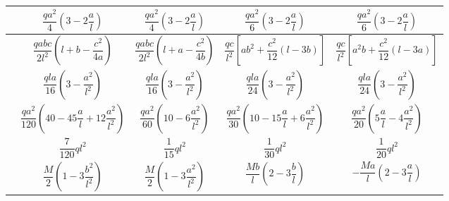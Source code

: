 \begin{table}[H]
{\begin{tabular}{m{4cm}cccc}
			 & \large{$\dfrac{qa^2}{4}\left(3-2\dfrac{a}{l}\right)$} & \large{$\dfrac{qa^2}{4}\left(3-2\dfrac{a}{l}\right)$} & \large{$\dfrac{qa^2}{6}\left(3-2\dfrac{a}{l}\right)$} & \large{$\dfrac{qa^2}{6}\left(3-2\dfrac{a}{l}\right)$} \\ \midrule
			 & \large{$\dfrac{qabc}{2l^2}\left(l+b-\dfrac{c^2}{4a}\right)$} & \large{$\dfrac{qabc}{2l^2}\left(l+a-\dfrac{c^2}{4b}\right)$} & \large{$\dfrac{qc}{l^2}\left[ab^2+\dfrac{c^2}{12}\left(l-3b\right)\right]$} & \large{$\dfrac{qc}{l^2}\left[a^2b+\dfrac{c^2}{12}\left(l-3a\right)\right]$} \\ \midrule
			 & \large{$\dfrac{qla}{16}\left(3-\dfrac{a^2}{l^2}\right)$} & \large{$\dfrac{qla}{16}\left(3-\dfrac{a^2}{l^2}\right)$} & \large{$\dfrac{qla}{24}\left(3-\dfrac{a^2}{l^2}\right)$} & \large{$\dfrac{qla}{24}\left(3-\dfrac{a^2}{l^2}\right)$} \\ \midrule
			 & \large{$\dfrac{qa^2}{120}\left(40-45\dfrac{a}{l}+12\dfrac{a^2}{l^2}\right)$} & \large{$\dfrac{qa^2}{60}\left(10-6\dfrac{a^2}{l^2}\right)$} & \large{$\dfrac{qa^2}{30}\left(10-15\dfrac{a}{l}+6\dfrac{a^2}{l^2}\right)$} & \large{$\dfrac{qa^2}{20}\left(5\dfrac{a}{l}-4\dfrac{a^2}{l^2}\right)$} \\ \midrule
			 & \large{$\dfrac{7}{120}ql^2$} & \large{$\dfrac{1}{15}ql^2$} & \large{$\dfrac{1}{30}ql^2$} & \large{$\dfrac{1}{20}ql^2$} \\ \midrule
			 & \large{$\dfrac{M}{2}\left(1-3\dfrac{b^2}{l^2}\right)$} & \large{$\dfrac{M}{2}\left(1-3\dfrac{a^2}{l^2}\right)$} & \large{$\dfrac{Mb}{l}\left(2-3\dfrac{b}{l}\right)$} & \large{$-\dfrac{Ma}{l}\left(2-3\dfrac{a}{l}\right)$} \\ \midrule
		\end{tabular}
	} %
	\label{tab:empotPerf}
\end{table}



\newpage

